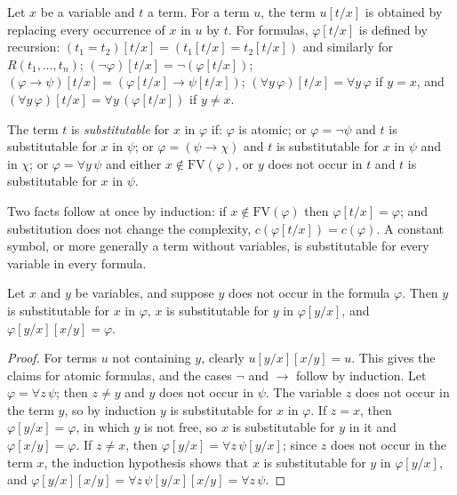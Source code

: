 \begin{definition}\label{logic:definition-substitution}
Let $x$ be a variable and $t$ a term. For a term $u$, the term $u[t/x]$ is
obtained by replacing every occurrence of $x$ in $u$ by $t$. For formulas,
$\varphi[t/x]$ is defined by recursion:
$(t_1 = t_2)[t/x] = (t_1[t/x] = t_2[t/x])$ and similarly for
$R(t_1, \ldots, t_n)$; $(\neg\varphi)[t/x] = \neg(\varphi[t/x])$;
$(\varphi \to \psi)[t/x] = (\varphi[t/x] \to \psi[t/x])$;
$(\forall y\,\varphi)[t/x] = \forall y\,\varphi$ if $y = x$, and
$(\forall y\,\varphi)[t/x] = \forall y\,(\varphi[t/x])$ if $y \neq x$.

The term $t$ is \emph{substitutable} for $x$ in $\varphi$ if: $\varphi$ is
atomic; or $\varphi = \neg\psi$ and $t$ is substitutable for $x$ in $\psi$; or
$\varphi = (\psi \to \chi)$ and $t$ is substitutable for $x$ in $\psi$ and in
$\chi$; or $\varphi = \forall y\,\psi$ and either $x \notin \mathrm{FV}(\varphi)$,
or $y$ does not occur in $t$ and $t$ is substitutable for $x$ in $\psi$.
\end{definition}

\begin{remark}\label{logic:remark-substitution}
Two facts follow at once by induction: if $x \notin \mathrm{FV}(\varphi)$
then $\varphi[t/x] = \varphi$; and substitution does not change the
complexity, $c(\varphi[t/x]) = c(\varphi)$. A constant symbol, or more
generally a term without variables, is substitutable for every variable in
every formula.
\end{remark}

\begin{lemma}\label{logic:lemma-rereplacement}
Let $x$ and $y$ be variables, and suppose $y$ does not occur in the formula
$\varphi$. Then $y$ is substitutable for $x$ in $\varphi$, $x$ is substitutable
for $y$ in $\varphi[y/x]$, and $\varphi[y/x][x/y] = \varphi$.
\end{lemma}

\begin{proof}
For terms $u$ not containing $y$, clearly $u[y/x][x/y] = u$. This gives the
claims for atomic formulas, and the cases $\neg$ and $\to$ follow by induction.
Let $\varphi = \forall z\,\psi$; then $z \neq y$ and $y$ does not occur in
$\psi$. The variable $z$ does not occur in the term $y$, so by induction $y$ is
substitutable for $x$ in $\varphi$. If $z = x$, then $\varphi[y/x] = \varphi$,
in which $y$ is not free, so $x$ is substitutable for $y$ in it and
$\varphi[x/y] = \varphi$. If $z \neq x$, then $\varphi[y/x] = \forall z\,\psi[y/x]$;
since $z$ does not occur in the term $x$, the induction hypothesis shows that
$x$ is substitutable for $y$ in $\varphi[y/x]$, and
$\varphi[y/x][x/y] = \forall z\,\psi[y/x][x/y] = \forall z\,\psi$.
\end{proof}

